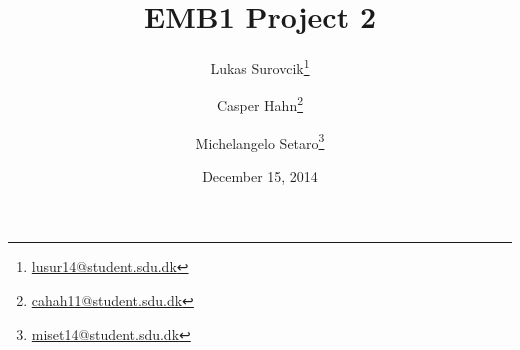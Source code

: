 

\title{EMB1 Project 2}
\date{December 15, 2014} 
\author{Lukas Surovcik\thanks{\url{lusur14@student.sdu.dk}}}
\author{Casper Hahn\thanks{\url{cahah11@student.sdu.dk}}}
\author{Michelangelo Setaro\thanks{\url{miset14@student.sdu.dk}}}


